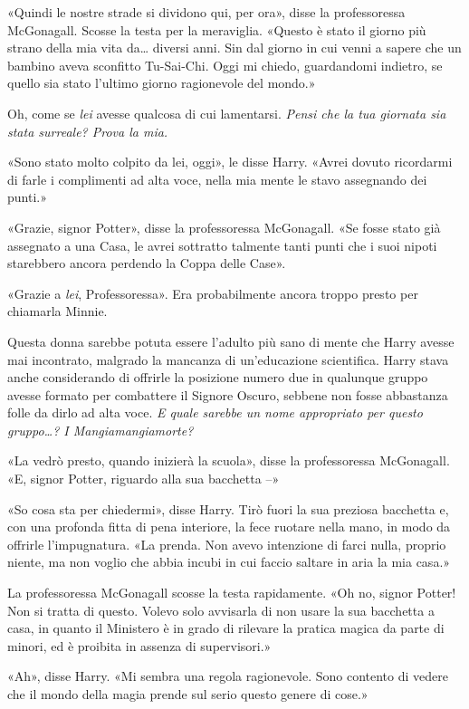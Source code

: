 «Quindi le nostre strade si dividono qui, per ora», disse la professoressa McGonagall. Scosse la testa per la meraviglia. «Questo è stato il giorno più strano della mia vita da… diversi anni. Sin dal giorno in cui venni a sapere che un bambino aveva sconfitto Tu-Sai-Chi. Oggi mi chiedo, guardandomi indietro, se quello sia stato l’ultimo giorno ragionevole del mondo.»

Oh, come se \textit{lei} avesse qualcosa di cui lamentarsi. \textit{Pensi che la tua giornata sia stata surreale? Prova la mia.}

«Sono stato molto colpito da lei, oggi», le disse Harry. «Avrei dovuto ricordarmi di farle i complimenti ad alta voce, nella mia mente le stavo assegnando dei punti.»

«Grazie, signor Potter», disse la professoressa McGonagall. «Se fosse stato già assegnato a una Casa, le avrei sottratto talmente tanti punti che i suoi nipoti starebbero ancora perdendo la Coppa delle Case».

«Grazie a \textit{lei}, Professoressa». Era probabilmente ancora troppo presto per chiamarla Minnie.

Questa donna sarebbe potuta essere l’adulto più sano di mente che Harry avesse mai incontrato, malgrado la mancanza di un’educazione scientifica. Harry stava anche considerando di offrirle la posizione numero due in qualunque gruppo avesse formato per combattere il Signore Oscuro, sebbene non fosse abbastanza folle da dirlo ad alta voce. \textit{E quale sarebbe un nome appropriato per questo gruppo…? I Mangiamangiamorte?}

«La vedrò presto, quando inizierà la scuola», disse la professoressa McGonagall. «E, signor Potter, riguardo alla sua bacchetta –»

«So cosa sta per chiedermi», disse Harry. Tirò fuori la sua preziosa bacchetta e, con una profonda fitta di pena interiore, la fece ruotare nella mano, in modo da offrirle l’impugnatura. «La prenda. Non avevo intenzione di farci nulla, proprio niente, ma non voglio che abbia incubi in cui faccio saltare in aria la mia casa.»

La professoressa McGonagall scosse la testa rapidamente. «Oh no, signor Potter! Non si tratta di questo. Volevo solo avvisarla di non usare la sua bacchetta a casa, in quanto il Ministero è in grado di rilevare la pratica magica da parte di minori, ed è proibita in assenza di supervisori.»

«Ah», disse Harry. «Mi sembra una regola ragionevole. Sono contento di vedere che il mondo della magia prende sul serio questo genere di cose.»

